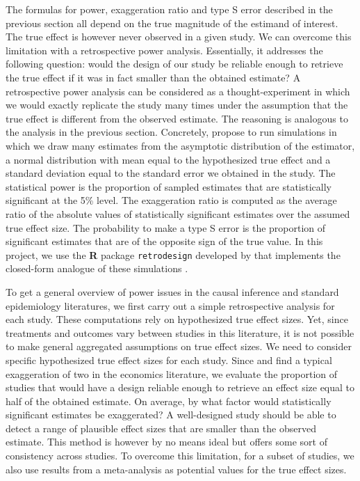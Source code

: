 \documentclass[12pt]{article}
\begin{document}
        The formulas for power, exaggeration ratio and type S error described in the previous section all depend on the true magnitude of the estimand of interest. The true effect is however never observed in a given study.  We can overcome this limitation with a retrospective power analysis. Essentially, it addresses the following question: would the design of our study be reliable enough to retrieve the true effect if it was in fact smaller than the obtained estimate? A retrospective power analysis can be considered as a thought-experiment in which we would exactly replicate the study many times under the assumption that the true effect is different from the observed estimate. The reasoning is analogous to the analysis in the previous section. Concretely, \cite{gelman_beyond_2014} propose to run simulations in which we draw many estimates from the asymptotic distribution of the estimator, a normal distribution with mean equal to the hypothesized true effect and a standard deviation equal to the standard error we obtained in the study. The statistical power is the proportion of sampled estimates that are statistically significant at the 5\% level. The exaggeration ratio is computed as the average ratio of the absolute values of statistically significant estimates over the assumed true effect size. The probability to make a type S error is the proportion of significant estimates that are of the opposite sign of the true value. In this project, we use the \textbf{\textsf{R}} package \texttt{retrodesign} developed by \cite{timm_retrodesign_2019} that implements the closed-form analogue of these simulations \citep{lu_note_2019}.
    
        To get a general overview of power issues in the causal inference and standard epidemiology literatures, we first carry out a simple retrospective analysis for each study. These computations rely on hypothesized true effect sizes. Yet, since treatments and outcomes vary between studies in this literature, it is not possible to make general aggregated assumptions on true effect sizes. We need to consider specific hypothesized true effect sizes for each study. Since \cite{ioannidis_power_2017} and \cite{ferraro_featureis_2020} find a typical exaggeration of two in the economics literature, we evaluate the proportion of studies that would have a design reliable enough to retrieve an effect size equal to half of the obtained estimate. On average, by what factor would statistically significant estimates be exaggerated? A well-designed study should be able to detect a range of plausible effect sizes that are smaller than the observed estimate. This method is however by no means ideal but offers some sort of consistency across studies. To overcome this limitation, for a subset of studies, we also use results from a meta-analysis as potential values for the true effect sizes. 
\end{document}
